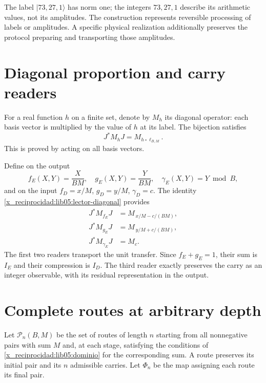 The label \(|73,27,1\rangle\) has norm one; the integers
\(73,27,1\) describe its arithmetic values, not its amplitudes.
The construction represents reversible processing of labels
or amplitudes. A specific physical realization additionally preserves
the protocol preparing and transporting those amplitudes.

\section{Diagonal proportion and carry readers}
\label{x_reciprocidad:lib05:diagonales}

For a real function \(h\) on a finite set, denote
by \(M_h\) its diagonal operator: each basis vector is multiplied
by the value of \(h\) at its label. The bijection satisfies
\begin{equation}
 J^*M_hJ=M_{h\circ\ell_{B,M}}.
 \label{x_reciprocidad:lib05:lector-diagonal}
\end{equation}
This is proved by acting on all basis vectors.

Define on the output
\begin{equation}
 f_E(X,Y)=\frac{X}{BM},\quad
 g_E(X,Y)=\frac{Y}{BM},\quad
 \gamma_E(X,Y)=Y\bmod B,
 \label{x_reciprocidad:lib05:lectores-salida}
\end{equation}
and on the input \(f_D=x/M\), \(g_D=y/M\), \(\gamma_D=c\).
The identity \eqref{x_reciprocidad:lib05:lector-diagonal} provides
\begin{align}
 J^*M_{f_E}J&=M_{\,x/M-c/(BM)},\nonumber\\
 J^*M_{g_E}J&=M_{\,y/M+c/(BM)},\nonumber\\
 J^*M_{\gamma_E}J&=M_c.
 \label{x_reciprocidad:lib05:transporte-fracciones}
\end{align}
The first two readers transport the unit transfer.
Since \(f_E+g_E=1\), their sum is \(I_E\) and their compression is
\(I_D\). The third reader exactly preserves the carry as
an integer observable, with its residual representation in the output.

\section{Complete routes at arbitrary depth}
\label{x_reciprocidad:lib05:rutas}

Let \(\mathcal P_n(B,M)\) be the set of routes of length \(n\)
starting from all nonnegative pairs with sum \(M\) and, at
each stage, satisfying the conditions of
\eqref{x_reciprocidad:lib05:dominio} for the corresponding sum. A route preserves
its initial pair and its \(n\) admissible carries. Let
\(\Phi_n\) be the map assigning each route its final pair.

